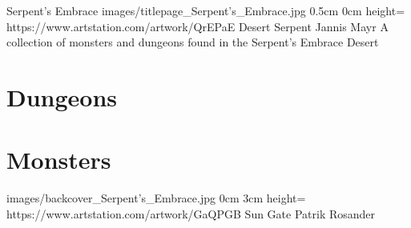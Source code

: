 \documentclass[letterpaper,openany,twoside,twocolumn]{book}
\begin{document}
	\bookTitlePage
		{Serpent's Embrace}
		{images/titlepage_Serpent's_Embrace.jpg}
		{0.5cm}
		{0cm}
		{height=\paperheight}
		{https://www.artstation.com/artwork/QrEPaE}
		{Desert Serpent}
		{Jannis Mayr}
		{A collection of monsters and dungeons found in the Serpent's Embrace Desert}
	
	\tableofcontents
	
	\mainmatter
	
	\DungeonSheetGeometry
	\part{Dungeons}
	
	
	\MonsterSheetGeometry
	\part{Monsters}
	
	
	
	
	\bookLastPage
		{images/backcover_Serpent's_Embrace.jpg}
		{0cm}
		{3cm}
		{height=\paperheight}
		{https://www.artstation.com/artwork/GaQPGB}
		{Sun Gate}
		{Patrik Rosander}
		{}
\end{document}
